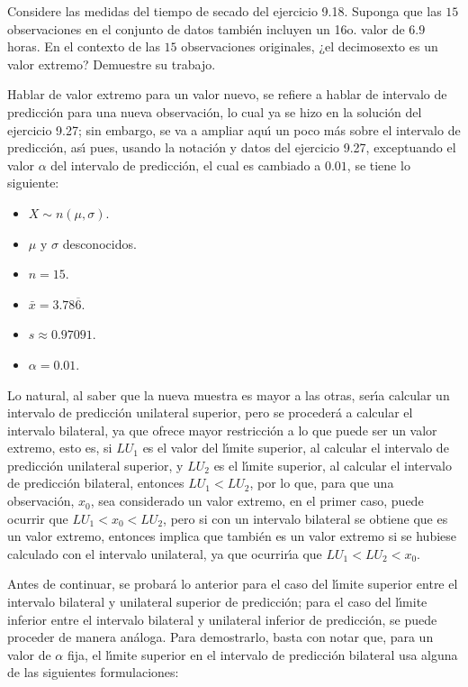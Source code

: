 \begin{enunciado}
 Considere las medidas del tiempo de secado del ejercicio 9.18. Suponga que las $15$ observaciones en el conjunto de datos tambi\'en incluyen un 16o. valor de $6.9$ horas. En el contexto de las $15$ observaciones originales, ¿el decimosexto es un valor extremo? Demuestre su trabajo.
\end{enunciado}

\begin{solucion}
 Hablar de valor extremo para un valor nuevo, se refiere a hablar de intervalo de predicci\'on para una nueva observaci\'on, lo cual ya se hizo en la soluci\'on del ejercicio 9.27; sin embargo, se va a ampliar aqu\'{\i} un poco m\'as sobre el intervalo de predicci\'on, as\'{\i} pues, usando la notaci\'on y datos del ejercicio 9.27, exceptuando el valor $\alpha$ del intervalo de predicci\'on, el cual es cambiado a $0.01$, se tiene lo siguiente:
 \begin{itemize}
  \item $X\sim n(\mu, \sigma)$.
  \item $\mu$ y $\sigma$ desconocidos.
  \item $n=15$.
  \item $\bar{x} = 3.78\overline{6}$.
  \item $s\approx 0.97091$.
  \item $\alpha=0.01$.
 \end{itemize}
 Lo natural, al saber que la nueva muestra es mayor a las otras, ser\'{\i}a calcular un intervalo de predicci\'on unilateral superior, pero se proceder\'a a calcular el intervalo bilateral, ya que ofrece mayor restricci\'on a lo que puede ser  un valor extremo, esto es, si $LU_1$ es el valor del l\'{\i}mite superior, al calcular el intervalo de predicci\'on unilateral superior, y $LU_2$ es el l\'{\i}mite superior, al calcular el intervalo de predicci\'on bilateral, entonces $LU_1 < LU_2$, por lo que, para que una observaci\'on, $x_0$, sea considerado un valor extremo, en el primer caso, puede ocurrir que $LU_1 < x_0 < LU_2$, pero si con un intervalo bilateral se obtiene que es un valor extremo, entonces implica que tambi\'en es un valor extremo si se hubiese calculado con el intervalo unilateral, ya que ocurrir\'{\i}a que $LU_1 < LU_2 < x_0$.
 \par 
 Antes de continuar, se probar\'a lo anterior para el caso del l\'{\i}mite superior entre el intervalo bilateral y unilateral superior de predicci\'on; para el caso del l\'{\i}mite inferior entre el intervalo bilateral y unilateral inferior de predicci\'on, se puede proceder de manera an\'aloga. Para demostrarlo, basta con notar que, para un valor de $\alpha$ fija, el l\'{\i}mite superior en el intervalo de predicci\'on bilateral usa alguna de las siguientes formulaciones:

\end{solucion}
